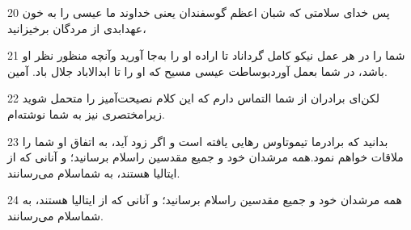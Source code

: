 \par 20 پس خدای سلامتی که شبان اعظم گوسفندان یعنی خداوند ما عیسی را به خون عهدابدی از مردگان برخیزانید،
\par 21 شما را در هر عمل نیکو کامل گرداناد تا اراده او را به‌جا آورید وآنچه منظور نظر او باشد، در شما بعمل آوردبوساطت عیسی مسیح که او را تا ابدالاباد جلال باد. آمین.
\par 22 لکن‌ای برادران از شما التماس دارم که این کلام نصیحت‌آمیز را متحمل شوید زیرامختصری نیز به شما نوشته‌ام.
\par 23 بدانید که برادرما تیموتاوس رهایی یافته است و اگر زود آید، به اتفاق او شما را ملاقات خواهم نمود.همه مرشدان خود و جمیع مقدسین راسلام برسانید؛ و آنانی که از ایتالیا هستند، به شماسلام می‌رسانند.
\par 24 همه مرشدان خود و جمیع مقدسین راسلام برسانید؛ و آنانی که از ایتالیا هستند، به شماسلام می‌رسانند.



